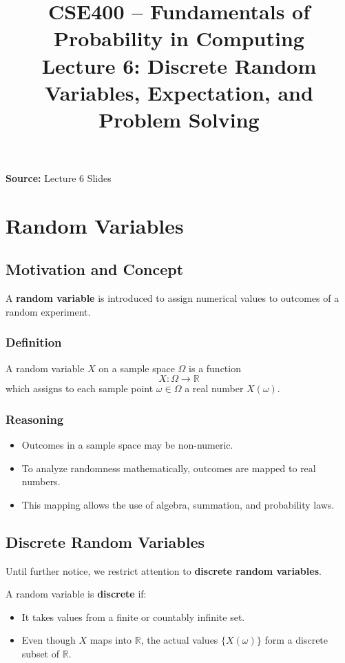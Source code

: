 \documentclass[11pt]{article}
\title{\textbf{CSE400 – Fundamentals of Probability in Computing}\\
\vspace{0.3cm}
\large Lecture 6: Discrete Random Variables, Expectation, and Problem Solving}
\date{}
\author{}
\begin{document}
\maketitle

\noindent
\textbf{Source:} Lecture 6 Slides

\vspace{0.3cm}

\section{Random Variables}

\subsection{Motivation and Concept}

A \textbf{random variable} is introduced to assign numerical values to outcomes of a random experiment.

\subsubsection*{Definition}
A random variable $X$ on a sample space $\Omega$ is a function
\[
X : \Omega \rightarrow \mathbb{R}
\]
which assigns to each sample point $\omega \in \Omega$ a real number $X(\omega)$.

\subsubsection*{Reasoning}
\begin{itemize}
    \item Outcomes in a sample space may be non-numeric.
    \item To analyze randomness mathematically, outcomes are mapped to real numbers.
    \item This mapping allows the use of algebra, summation, and probability laws.
\end{itemize}

\subsection{Discrete Random Variables}

Until further notice, we restrict attention to \textbf{discrete random variables}.

A random variable is \textbf{discrete} if:
\begin{itemize}
    \item It takes values from a finite or countably infinite set.
    \item Even though $X$ maps into $\mathbb{R}$, the actual values $\{X(\omega)\}$ form a discrete subset of $\mathbb{R}$.
\end{itemize}
\end{document}
